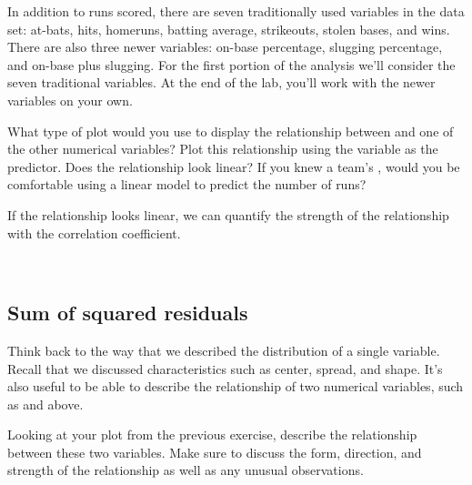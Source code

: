 \documentclass[11pt]{article}
\begin{document}
In addition to runs scored, there are seven traditionally used variables in the data set: at-bats, hits, homeruns, batting average, strikeouts, stolen bases, and wins. There are also three newer variables: on-base percentage, slugging percentage, and on-base plus slugging.  For the first portion of the analysis we'll consider the seven traditional variables. At the end of the lab, you'll work with the newer variables on your own.

\begin{exercise}What type of plot would you use to display the relationship between \texttt{} and one of the other numerical variables?  Plot this relationship using the variable \texttt{} as the predictor.  Does the relationship look linear?  If you knew a team's \texttt{}, would you be comfortable using a linear model to predict the number of runs?
\end{exercise}

If the relationship looks linear, we can quantify the strength of the relationship with the correlation coefficient.

\ttfamily\noindent
\hlstd{}\hspace*{\fill}\\
\hlstd{}\hlkeyword{(}\hlkeyword{\usebox{\hlnormalsizeboxdollar}}\hlkeyword{,}{\ }\hlkeyword{\usebox{\hlnormalsizeboxdollar}}\hlkeyword{)}\hspace*{\fill}
\normalfont

\subsection*{Sum of squared residuals}
Think back to the way that we described the distribution of a single variable. Recall that we discussed characteristics such as center, spread, and shape.  It's also useful to be able to describe the relationship of two numerical variables, such as \texttt{} and \texttt{} above.

\begin{exercise}
Looking at your plot from the previous exercise, describe the relationship between these two variables. Make sure to discuss the form, direction, and strength of the relationship as well as any unusual observations.
\end{exercise}
\end{document}
